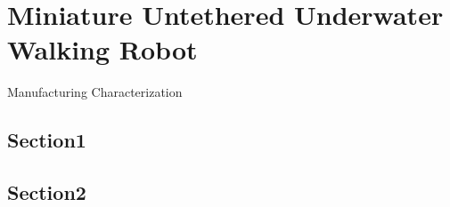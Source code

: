\chapter{Miniature Untethered Underwater Walking Robot}
Manufacturing 
Characterization
\section{Section1}
\section{Section2}